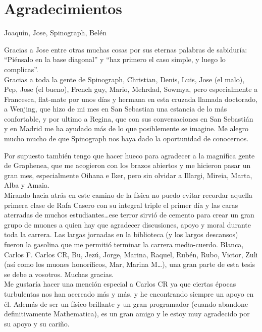\chapter*{Agradecimientos}
Joaquín, Jose, Spinograph, Belén %


Gracias a Jose entre otras muchas cosas por sus eternas palabras de sabiduría: ``Piénsalo en la base diagonal'' y ``haz primero el caso simple, y luego lo complicas''.\\

Gracias a toda la gente de Spinograph, Christian, Denis, Luis, Jose (el malo), Pep, Jose (el bueno), French guy, Mario, Mehrdad, Sowmya, pero especialmente a Francesca, flat-mate por unos días y hermana en esta cruzada llamada doctorado, a Wenjing, que hizo de mi mes en San Sebastian una estancia de lo más confortable, y por ultimo a Regina, que con sus conversaciones en San Sebastián y en Madrid me ha ayudado más de lo que posiblemente se imagine. Me alegro mucho mucho de que Spinograph nos haya dado la oportunidad de conocernos.

Por supuesto también tengo que hacer hueco para agradecer a la magnífica gente de Graphenea, que me acogieron con los brazos abiertos y me hicieron pasar un gran mes, especialmente Oihana e Iker, pero sin olvidar a Illargi, Mireia, Marta, Alba y Amaia.\\


Mirando hacia atrás en este camino de la física no puedo evitar recordar aquella primera clase de Rafa Casero con su integral triple el primer día y las caras aterradas de muchos estudiantes\dots ese terror sirvió de cemento para crear un gran grupo de muones a quien hay que agradecer discusiones, apoyo y moral durante toda la carrera.
Las largas jornadas en la biblioteca (y los largos descansos) fueron la gasolina que me permitió terminar la carrera medio-cuerdo. Blanca, Carlos F. Carlos CR, Bu, Jezú, Jorge, Marina, Raquel, Rubén, Rubo, Victor, Zuli (así como los muones honoríficos, Mar, Marina M\dots), una gran parte de esta tesis se debe a vosotros. Muchas gracias.\\

Me gustaría hacer una mención especial a Carlos CR ya que ciertas épocas turbulentas nos han acercado más y más, y he encontrando siempre un apoyo en él. Además de ser un físico brillante y un gran programador (cuando abandone definitivamente Mathematica), es un gran amigo y le estoy muy agradecido por su apoyo y su cariño.\\

